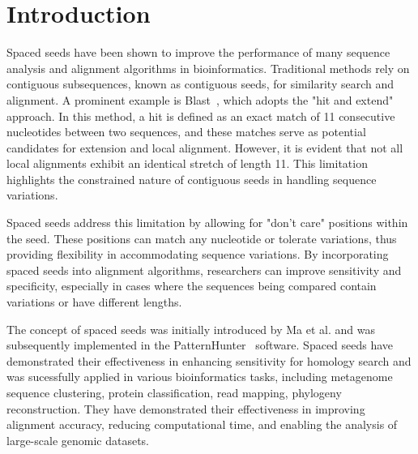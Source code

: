 \documentclass{PHlab-thesis}
\begin{document}

\printnomenclature[5cm]

\newpage
\setcounter{page}{1}


\chapter{Introduction}
Spaced seeds have been shown to improve the performance of many sequence analysis and alignment algorithms in bioinformatics. Traditional methods rely on contiguous subsequences, known as contiguous seeds, for similarity search and alignment. A prominent example is Blast~\cite{ALTSCHUL1990Blast}, which adopts the "hit and extend" approach. In this method, a hit is defined as an exact match of 11 consecutive nucleotides between two sequences, and these matches serve as potential candidates for extension and local alignment. However, it is evident that not all local alignments exhibit an identical stretch of length 11. This limitation highlights the constrained nature of contiguous seeds in handling sequence variations.

Spaced seeds address this limitation by allowing for "don't care" positions within the seed. These positions can match any nucleotide or tolerate variations, thus providing flexibility in accommodating sequence variations. By incorporating spaced seeds into alignment algorithms, researchers can improve sensitivity and specificity, especially in cases where the sequences being compared contain variations or have different lengths.

The concept of spaced seeds was initially introduced by Ma et al. and was subsequently implemented in the PatternHunter~\cite{MaB2002PatternHunter} software. Spaced seeds have demonstrated their effectiveness in enhancing sensitivity for homology search and was sucessfully applied in various bioinformatics tasks, including metagenome sequence clustering, protein classification, read mapping, phylogeny reconstruction. They have demonstrated their effectiveness in improving alignment accuracy, reducing computational time, and enabling the analysis of large-scale genomic datasets.
\end{document}
